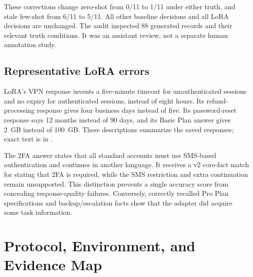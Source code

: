 \documentclass[10pt,letterpaper]{article}
\begin{document}
These corrections change zero-shot from 0/11 to 1/11 under either truth, and stale few-shot from 6/11 to 5/11. All other baseline decisions and all LoRA decisions are unchanged. The audit inspected 88 generated records and their relevant truth conditions. It was an assistant review, not a separate human annotation study.

\subsection{Representative LoRA errors}
LoRA's VPN response invents a five-minute timeout for unauthenticated sessions and no expiry for authenticated sessions, instead of eight hours. Its refund-processing response gives four business days instead of five. Its password-reset response says 12 months instead of 90 days, and its Basic Plan answer gives 2~GB instead of 100~GB. These descriptions summarize the saved responses; exact text is in .

The 2FA answer states that all standard accounts must use SMS-based authentication and continues in another language. It receives a v2 core-fact match for stating that 2FA is required, while the SMS restriction and extra continuation remain unsupported. This distinction prevents a single accuracy score from concealing response-quality failures. Conversely, correctly recalled Pro Plan specifications and backup/escalation facts show that the adapter did acquire some task information.

\clearpage
\section{Protocol, Environment, and Evidence Map}\label{app:artifacts}
\end{document}
